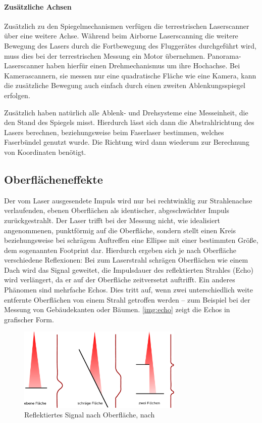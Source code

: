 \documentclass[a4paper,12pt,bibliography=totoc, listof=totoc,titlepage,pointlessnumbers]{scrreprt}
\begin{document}
\paragraph{Zusätzliche Achsen}
Zusätzlich zu den Spiegelmechanismen verfügen die terrestrischen Laser\-scan\-ner über eine weitere Achse. Während beim Airborne Laserscanning die weitere Bewegung des Lasers durch die Fortbewegung des Fluggerätes durchgeführt wird, muss dies bei der terrestrischen Messung ein Motor übernehmen. Panorama-Laser\-scan\-ner haben hierfür einen Drehmechanismus um ihre Hochachse. Bei Kamerascannern, sie messen nur eine quadratische Fläche wie eine Kamera, kann die zusätzliche Bewegung auch einfach durch einen zweiten Ablenkungsspiegel erfolgen. \citep[S. 37]{beraldin}

Zusätzlich haben natürlich alle Ablenk- und Drehsysteme eine Messeinheit, die den Stand des Spiegels misst. Hierdurch lässt sich dann die Abstrahlrichtung des Lasers berechnen, beziehungsweise beim Faserlaser bestimmen, welches Faserbündel genutzt wurde. Die Richtung wird dann wiederum zur Berechnung von Koordinaten benötigt.


\subsection{Oberflächeneffekte}
Der vom Laser ausgesendete Impuls wird nur bei rechtwinklig zur Strahlenachse verlaufenden, ebenen Oberflächen als identischer, abgeschwächter Impuls zurückgestrahlt. Der Laser trifft bei der Messung nicht, wie idealisiert angenommenen, punktförmig auf die Oberfläche, sondern stellt einen Kreis beziehungsweise bei schrägem Auftreffen eine Ellipse mit einer bestimmten Größe, dem sogenannten Footprint dar. Hierdurch ergeben sich je nach Oberfläche verschiedene Reflexionen: Bei zum Laserstrahl schrägen Oberflächen wie einem Dach wird das Signal geweitet, die Impulsdauer des reflektierten Strahles (Echo) wird verlängert, da er auf der Oberfläche zeitversetzt auftrifft. Ein anderes Phänomen sind mehrfache Echos. Dies tritt auf, wenn zwei unterschiedlich weite entfernte Oberflächen von einem Strahl getroffen werden -- zum Beispiel bei der Messung von Gebäudekanten oder Bäumen. \autoref{img:echo} zeigt die Echos in grafischer Form. \citep[S. 28]{beraldin}

\begin{figure}
 \centering
 \includegraphics[width=0.7\textwidth]{./img/echo.pdf}
 \caption{Reflektiertes Signal nach Oberfläche, nach \citet[S. 28]{beraldin}}
 \label{img:echo}
\end{figure}
\end{document}
